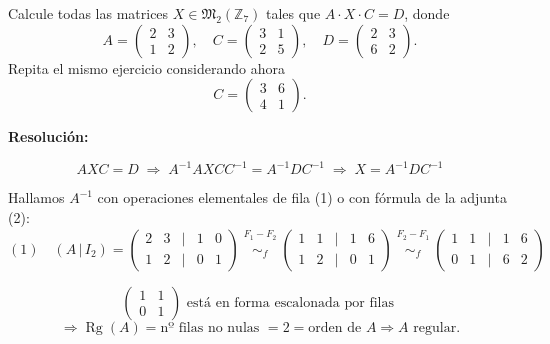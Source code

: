 \documentclass[a4paper,12pt]{article}
\begin{document}
\begin{ejercicio}[title=Ejercicio 19]
Calcule todas las matrices $X \in \mathfrak{M}_2(\mathbb{Z}_7)$ tales que $A \cdot X \cdot C = D$, donde
\[
A =
\begin{pmatrix}
2 & 3\\
1 & 2
\end{pmatrix}, \quad
C =
\begin{pmatrix}
3 & 1\\
2 & 5
\end{pmatrix}, \quad
D =
\begin{pmatrix}
2 & 3\\
6 & 2
\end{pmatrix}.
\]
Repita el mismo ejercicio considerando ahora
\[
C =
\begin{pmatrix}
3 & 6\\
4 & 1
\end{pmatrix}.
\]

\tcblower
\textbf{Resolución:}

\[
AXC = D \;\Rightarrow\; A^{-1} A X C C^{-1} = A^{-1} D C^{-1} \;\Rightarrow\; X = A^{-1} D C^{-1}
\]

\vspace{0.5em}

Hallamos $A^{-1}$ con operaciones elementales de fila (1) o con fórmula de la adjunta (2):
\[
(1) \quad (A \,|\, I_2) =
\begin{pmatrix}
2 & 3 &\Big|& 1 & 0\\
1 & 2 &\Big|& 0 & 1
\end{pmatrix}
\overset{\substack{F_1 - F_2 \\ {}}}{\sim_f}
\begin{pmatrix}
1 & 1 &\Big|& 1 & 6\\
1 & 2 &\Big|& 0 & 1
\end{pmatrix}
\overset{\substack{F_2 - F_1 \\ {}}}{\sim_f}
\begin{pmatrix}
1 & 1 &\Big|& 1 & 6\\
0 & 1 &\Big|& 6 & 2
\end{pmatrix}
\]

\vspace{0.5em}

\noindent
\[
\begin{pmatrix}
1 & 1\\
0 & 1
\end{pmatrix}
\text{ está en forma escalonada por filas }
\]
\[
\Rightarrow \operatorname{Rg}(A) =\text{nº filas no nulas }=2 = \text{orden de }A \Rightarrow A \text{ regular.}
\]


\end{ejercicio}
\end{document}
